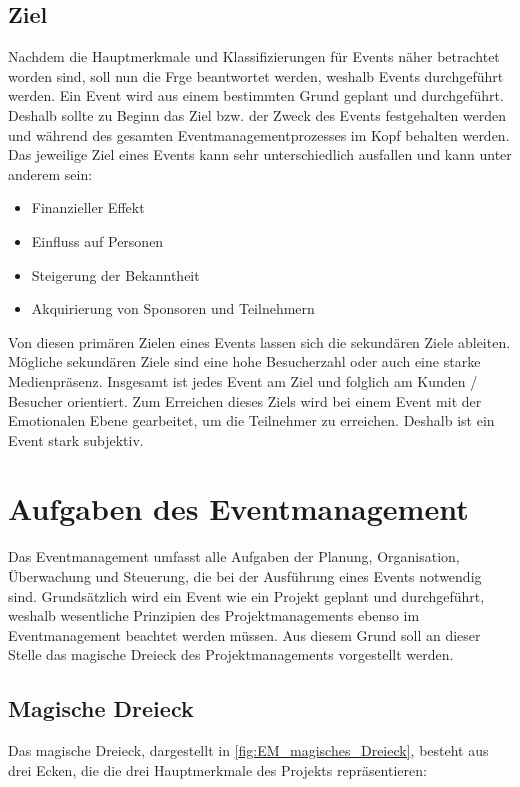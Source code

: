 \subsection{Ziel}\label{subsec:EM_Ziel}
Nachdem die Hauptmerkmale und Klassifizierungen für Events näher betrachtet worden sind, soll nun die Frge beantwortet werden, weshalb Events durchgeführt werden.
Ein Event wird aus einem bestimmten Grund geplant und durchgeführt.
Deshalb sollte zu Beginn das Ziel bzw. der Zweck des Events festgehalten werden und während des gesamten Eventmanagementprozesses im Kopf behalten werden.
Das jeweilige Ziel eines Events kann sehr unterschiedlich ausfallen und kann unter anderem sein:

\begin{itemize}
    \item Finanzieller Effekt
    \item Einfluss auf Personen
    \item Steigerung der Bekanntheit
    \item Akquirierung von Sponsoren und Teilnehmern
\end{itemize}

Von diesen primären Zielen eines Events lassen sich die sekundären Ziele ableiten.
Mögliche sekundären Ziele sind eine hohe Besucherzahl oder auch eine starke Medienpräsenz.
Insgesamt ist jedes Event am Ziel und folglich am Kunden / Besucher orientiert.
Zum Erreichen dieses Ziels wird bei einem Event mit der Emotionalen Ebene gearbeitet, um die Teilnehmer zu erreichen.
Deshalb ist ein Event stark subjektiv.\autocite[Vgl.][S. 6 ff.]{Holzbaur.2002}

\section{Aufgaben des Eventmanagement}
Das Eventmanagement umfasst alle Aufgaben der Planung, Organisation, Überwachung und Steuerung, die bei der Ausführung eines Events notwendig sind.
Grundsätzlich wird ein Event wie ein Projekt geplant und durchgeführt, weshalb wesentliche Prinzipien des Projektmanagements ebenso im Eventmanagement beachtet werden müssen.
Aus diesem Grund soll an dieser Stelle das magische Dreieck des Projektmanagements vorgestellt werden.\autocite[Vgl.][S. 22]{Holzbaur.2002}

\subsection{Magische Dreieck}
Das magische Dreieck, dargestellt in \autoref{fig:EM_magisches_Dreieck}, besteht aus drei Ecken, die die drei Hauptmerkmale des Projekts repräsentieren:

